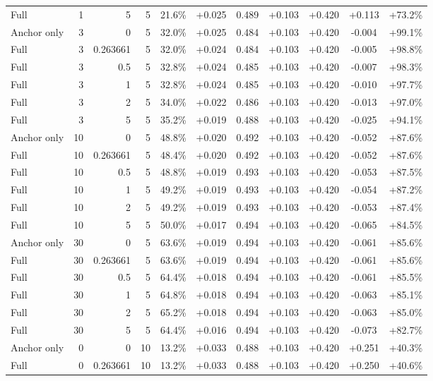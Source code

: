 \begin{table}[htbp]
\begin{tabular}{lrrrccccccc}
Full & 1 & 5 & 5 & 21.6\% & +0.025 & 0.489 & +0.103 & +0.420 & +0.113 & +73.2\% \\
Anchor only & 3 & 0 & 5 & 32.0\% & +0.025 & 0.484 & +0.103 & +0.420 & -0.004 & +99.1\% \\
Full & 3 & 0.263661 & 5 & 32.0\% & +0.024 & 0.484 & +0.103 & +0.420 & -0.005 & +98.8\% \\
Full & 3 & 0.5 & 5 & 32.8\% & +0.024 & 0.485 & +0.103 & +0.420 & -0.007 & +98.3\% \\
Full & 3 & 1 & 5 & 32.8\% & +0.024 & 0.485 & +0.103 & +0.420 & -0.010 & +97.7\% \\
Full & 3 & 2 & 5 & 34.0\% & +0.022 & 0.486 & +0.103 & +0.420 & -0.013 & +97.0\% \\
Full & 3 & 5 & 5 & 35.2\% & +0.019 & 0.488 & +0.103 & +0.420 & -0.025 & +94.1\% \\
Anchor only & 10 & 0 & 5 & 48.8\% & +0.020 & 0.492 & +0.103 & +0.420 & -0.052 & +87.6\% \\
Full & 10 & 0.263661 & 5 & 48.4\% & +0.020 & 0.492 & +0.103 & +0.420 & -0.052 & +87.6\% \\
Full & 10 & 0.5 & 5 & 48.8\% & +0.019 & 0.493 & +0.103 & +0.420 & -0.053 & +87.5\% \\
Full & 10 & 1 & 5 & 49.2\% & +0.019 & 0.493 & +0.103 & +0.420 & -0.054 & +87.2\% \\
Full & 10 & 2 & 5 & 49.2\% & +0.019 & 0.493 & +0.103 & +0.420 & -0.053 & +87.4\% \\
Full & 10 & 5 & 5 & 50.0\% & +0.017 & 0.494 & +0.103 & +0.420 & -0.065 & +84.5\% \\
Anchor only & 30 & 0 & 5 & 63.6\% & +0.019 & 0.494 & +0.103 & +0.420 & -0.061 & +85.6\% \\
Full & 30 & 0.263661 & 5 & 63.6\% & +0.019 & 0.494 & +0.103 & +0.420 & -0.061 & +85.6\% \\
Full & 30 & 0.5 & 5 & 64.4\% & +0.018 & 0.494 & +0.103 & +0.420 & -0.061 & +85.5\% \\
Full & 30 & 1 & 5 & 64.8\% & +0.018 & 0.494 & +0.103 & +0.420 & -0.063 & +85.1\% \\
Full & 30 & 2 & 5 & 65.2\% & +0.018 & 0.494 & +0.103 & +0.420 & -0.063 & +85.0\% \\
Full & 30 & 5 & 5 & 64.4\% & +0.016 & 0.494 & +0.103 & +0.420 & -0.073 & +82.7\% \\
Anchor only & 0 & 0 & 10 & 13.2\% & +0.033 & 0.488 & +0.103 & +0.420 & +0.251 & +40.3\% \\
Full & 0 & 0.263661 & 10 & 13.2\% & +0.033 & 0.488 & +0.103 & +0.420 & +0.250 & +40.6\% \\

\end{tabular}
\end{table}
